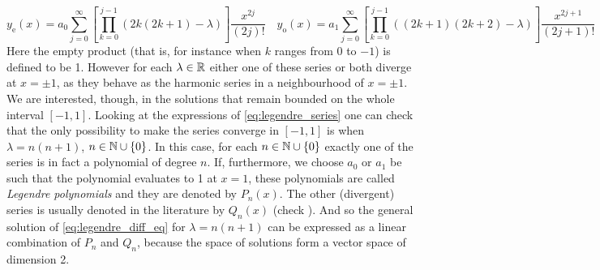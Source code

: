 \documentclass[../main.tex]{subfiles}
\begin{document}
\begin{equation}\label{eq:legendre_series}
  y_\mathrm{e}(x)=a_0\sum_{j=0}^{\infty}\left[\prod_{k=0}^{j-1}(2k(2k+1)-\lambda)\right]\frac{x^{2j}}{(2j)!}\quad y_\mathrm{o}(x)=a_1\sum_{j=0}^{\infty}\left[\prod_{k=0}^{j-1}((2k+1)(2k+2)-\lambda)\right]\frac{x^{2j+1}}{(2j+1)!}
\end{equation}
Here the empty product (that is, for instance when $k$ ranges from 0 to $-1$) is defined to be 1. However for each $\lambda\in\mathbb{R}$ either one of these series or both diverge at $x=\pm 1$, as they behave as the harmonic series in a neighbourhood of $x=\pm 1$. We are interested, though, in the solutions that remain bounded on the whole interval $[-1,1]$. Looking at the expressions of \cref{eq:legendre_series} one can check that the only possibility to make the series converge in $[-1,1]$ is when $\lambda =n(n+1)$, $n\in\mathbb{N}\cup\{0\}$. In this case, for each $n\in\mathbb{N}\cup\{0\}$ exactly one of the series is in fact a polynomial of degree $n$. If, furthermore, we choose $a_0$ or $a_1$ be such that the polynomial evaluates to 1 at $x=1$, these polynomials are called \emph{Legendre polynomials} and they are denoted by $P_n(x)$. The other (divergent) series is usually denoted in the literature by $Q_n(x)$ (check \cite{mathematical_methods,florida:legendre}). And so the general solution of \cref{eq:legendre_diff_eq} for $\lambda=n(n+1)$ can be expressed as a linear combination of $P_n$ and $Q_n$, because the space of solutions form a vector space of dimension 2.
\end{document}
